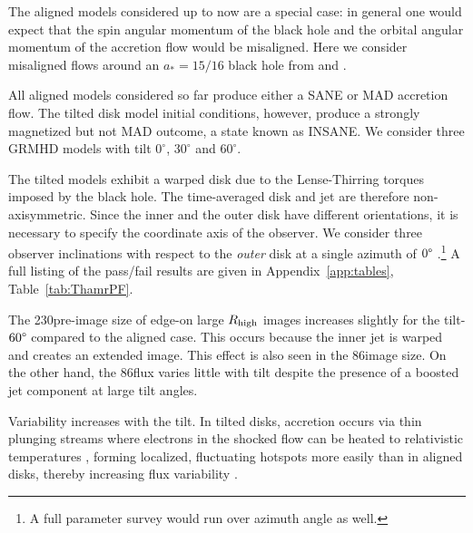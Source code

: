 The aligned models considered up to now are a special case: in general one would expect that the spin angular momentum of the black hole and the orbital angular momentum of the accretion flow would be misaligned.  Here we consider misaligned flows around an $a_*=15/16$ black hole from \citet{Liska2018} and \citet{Chatterjee2020}.

All aligned models considered so far produce either a SANE or MAD accretion flow.  The tilted disk model initial conditions, however, produce a strongly magnetized but not MAD outcome, a state known as INSANE.  We consider three GRMHD models with tilt $0^{\circ}$, $30^{\circ}$ and $60^{\circ}$.

The tilted models exhibit a warped disk due to the Lense-Thirring torques imposed by the black hole.  The time-averaged disk and jet are therefore non-axisymmetric.
Since the inner and the outer disk have different orientations, it is necessary to specify the coordinate axis of the observer.  We consider three  observer inclinations with respect to the {\em outer} disk at a single azimuth of $0\degree$ \citep[for more details, see][]{Chatterjee2020}.\footnote{A full parameter survey would run over azimuth angle as well.}  A full listing of the pass/fail results are given in Appendix~\ref{app:tables}, Table~\ref{tab:ThamrPF}.

The 230\GHz pre-image size of edge-on large $R_\mathrm{high}$ images increases slightly for the tilt-$60\degree$ compared to the aligned case. This occurs because the inner jet is warped and creates an extended image. This effect is also seen in the 86\GHz image size. On the other hand, the 86\GHz flux varies little with tilt despite the presence of a boosted jet component at large tilt angles.


Variability increases with the tilt. In tilted disks, accretion occurs via thin plunging streams \citep[e.g.,][]{Fragile2007} where electrons in the shocked flow can be heated to relativistic temperatures \citep[e.g.][]{Dexter2013}, forming localized, fluctuating hotspots more easily than in aligned disks, thereby increasing flux variability \citep{Chatterjee2020}.

